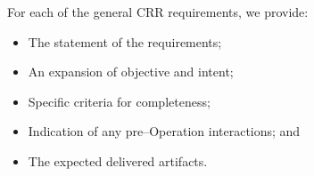 For each of the general CRR requirements, we provide:

\begin{itemize}
	\item The statement of the requirements;
	\item An expansion of objective and intent;
	\item Specific criteria for completeness;
	\item Indication of any pre--Operation interactions; and
	\item The expected delivered artifacts.
\end{itemize}
	